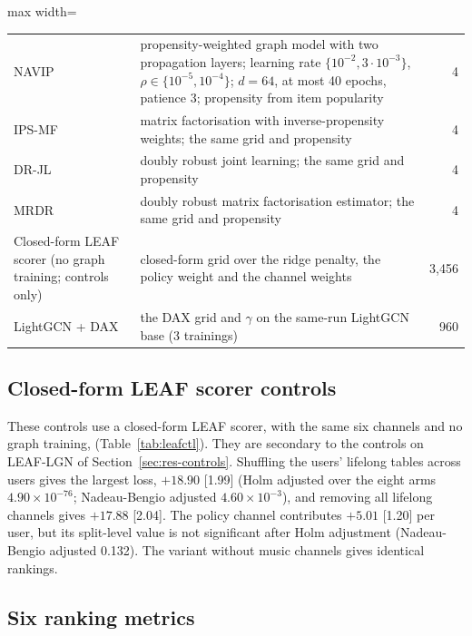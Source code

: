 \begin{table}[t]
\begin{adjustbox}{max width=\textwidth}
\begin{tabular}{p{}p{}r}
\raggedright NAVIP \citep{kim2022navip} & \raggedright propensity-weighted graph model with two propagation layers; learning rate $\{10^{-2},3\cdot10^{-3}\}$, $\rho\in\{10^{-5},10^{-4}\}$; $d=64$, at most 40 epochs, patience 3; propensity from item popularity & 4 \\
\raggedright IPS-MF \citep{schnabel2016} & \raggedright matrix factorisation with inverse-propensity weights; the same grid and propensity & 4 \\
\raggedright DR-JL \citep{wang2019drjl} & \raggedright doubly robust joint learning; the same grid and propensity & 4 \\
\raggedright MRDR \citep{guo2021mrdr} & \raggedright doubly robust matrix factorisation estimator; the same grid and propensity & 4 \\
\raggedright Closed-form LEAF scorer (no graph training; controls only) & \raggedright closed-form grid over the ridge penalty, the policy weight and the channel weights & 3,456 \\
\raggedright LightGCN + DAX & \raggedright the DAX grid and $\gamma$ on the same-run LightGCN base (3 trainings) & 960 \\
\bottomrule
\end{tabular}
\end{adjustbox}
\end{table}

\subsection{Closed-form LEAF scorer controls}\label{app:leafctl}

These controls use a closed-form LEAF scorer, with the same six channels and no graph training, (Table~\ref{tab:leafctl}). They are secondary to the
controls on LEAF-LGN of Section~\ref{sec:res-controls}. Shuffling the users' lifelong tables across users gives the largest loss, $+18.90$ [1.99] (Holm
adjusted over the eight arms $4.90\times10^{-76}$; Nadeau-Bengio adjusted $4.60\times10^{-3}$), and removing all lifelong channels gives $+17.88$ [2.04]. The
policy channel contributes $+5.01$ [1.20] per user, but its split-level value is not significant after Holm adjustment (Nadeau-Bengio adjusted 0.132). The
variant without music channels gives identical rankings.



\subsection{Six ranking metrics}\label{app:metrics}

